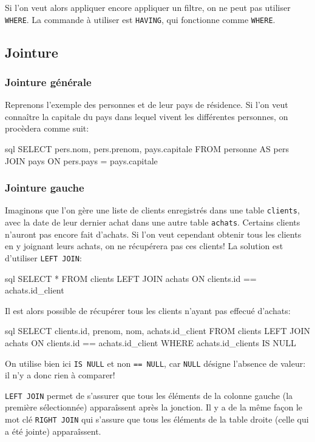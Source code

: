 \documentclass[a4paper]{scrartcl}
\begin{document}
			Si l'on veut alors appliquer encore appliquer un filtre, on ne peut pas utiliser \texttt{WHERE}.
			La commande à utiliser est \texttt{HAVING}, qui fonctionne comme \texttt{WHERE}.

		\subsection{Jointure}
			\subsubsection{Jointure générale}
				\semidef Reprenons l'exemple des personnes et de leur pays de résidence.
				Si l'on veut connaître la capitale du pays dans lequel vivent les différentes personnes, on procèdera comme suit:
				\begin{code}{sql}
					SELECT pers.nom, pers.prenom, pays.capitale
					FROM personne AS pers
					JOIN pays
					ON pers.pays = pays.capitale
				\end{code}

			\subsubsection{Jointure gauche}
				\semidef Imaginons que l'on gère une liste de clients enregistrés dans une table \texttt{clients}, 
				avec la date de leur dernier achat dans une autre table \texttt{achats}.
				Certains clients n'auront pas encore fait d'achats. 
				Si l'on veut cependant obtenir tous les clients en y joignant leurs achats, on ne récupérera pas ces clients!
				La solution est d'utiliser \texttt{LEFT JOIN}:
				\begin{code}{sql}
					SELECT *
					FROM clients
					LEFT JOIN achats ON clients.id == achats.id_client
				\end{code}

				Il est alors possible de récupérer tous les clients n'ayant pas effecué d'achats:
				\begin{code}{sql}
					SELECT clients.id, prenom, nom, achats.id_client
					FROM clients
					LEFT JOIN achats ON clients.id == achats.id_client
					WHERE achats.id_clients IS NULL
				\end{code}

				\rem On utilise bien ici \texttt{IS NULL} et non \texttt{== NULL}, car \texttt{NULL} désigne l'absence de valeur: il n'y a donc rien à comparer!

				\rem \texttt{LEFT JOIN} permet de s'assurer que tous les éléments de la colonne gauche (la première sélectionnée) 
				apparaîssent après la jonction. Il y a de la même façon le mot clé \texttt{RIGHT JOIN} qui s'assure que
				tous les éléments de la table droite (celle qui a été jointe) apparaîssent.
		
\end{document}
